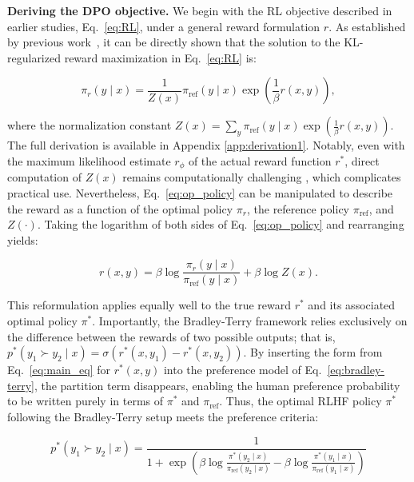 \textbf{Deriving the DPO objective.} We begin with the RL objective described in earlier studies, Eq.~\ref{eq:RL}, under a general reward formulation $r$. As established by previous work~\citep{peters2007reinforcement, peng2019advantage, korbak2022reinforcement, go2023aligning}, it can be directly shown that the solution to the KL-regularized reward maximization in Eq.~\ref{eq:RL} is:

\begin{equation}\label{eq:op_policy}
    \pi_r(y\mid x) = \frac{1}{Z(x)}\pi_\text{ref}(y\mid x)\exp\left(\frac{1}{\beta}r(x, y)\right),
\end{equation}

where the normalization constant $Z(x) =\sum_{y}\pi_\text{ref}(y\mid x)\exp\left(\frac{1}{\beta}r(x, y)\right)$. The full derivation is available in Appendix \ref{app:derivation1}. Notably, even with the maximum likelihood estimate $r_{\phi}$ of the actual reward function $r^*$, direct computation of $Z(x)$ remains computationally challenging \citep{korbak2022reinforcement, go2023aligning}, which complicates practical use. Nevertheless, Eq.~\ref{eq:op_policy} can be manipulated to describe the reward as a function of the optimal policy $\pi_r$, the reference policy $\pi_\text{ref}$, and $Z(\cdot)$. Taking the logarithm of both sides of Eq.~\ref{eq:op_policy} and rearranging yields:

\begin{equation}\label{eq:main_eq}
    r(x,y) =\beta \log \frac{\pi_r(y\mid x)}{\pi_\text{ref}(y\mid x)} + \beta \log Z(x).
\end{equation}

This reformulation applies equally well to the true reward $r^*$ and its associated optimal policy $\pi^*$. Importantly, the Bradley-Terry framework relies exclusively on the difference between the rewards of two possible outputs; that is, ${p^*(y_1 \succ y_2 \mid x) = \sigma(r^*(x, y_1) - r^*(x, y_2))}$. By inserting the form from Eq.~\ref{eq:main_eq} for $r^*(x,y)$ into the preference model of Eq.~\ref{eq:bradley-terry}, the partition term disappears, enabling the human preference probability to be written purely in terms of $\pi^*$ and $\pi_\text{ref}$. Thus, the optimal RLHF policy $\pi^*$ following the Bradley-Terry setup meets the preference criteria:

\begin{equation}\label{eq:objective}
    p^*(y_1\succ y_2 \mid x)=\frac{1}{1 + \exp\left(\beta \log \frac{\pi^*(y_2\mid x)}{\pi_\text{ref}(y_2\mid x)} - \beta \log \frac{\pi^*(y_1\mid x)}{\pi_\text{ref}(y_1\mid x)}\right)}
\end{equation}

